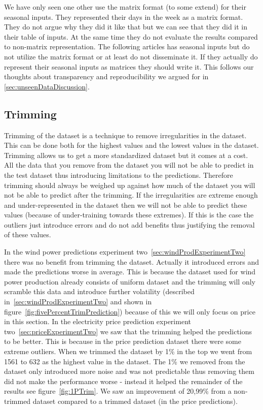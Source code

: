 We have only seen one other \cite{crowley2005weather} use the matrix format (to some extend) for their seasonal inputs. They represented their days in the week as a matrix format. They do not argue why they did it like that but we can see that they did it in their table of inputs. At the same time they do not evaluate the results compared to non-matrix representation. The following articles has seasonal inputs but do not utilize the matrix format \cite{szkuta1999electricity, singhal2011electricity} or at least do not disseminate it. If they actually do represent their seasonal inputs as matrices they should write it. This follows our thoughts about transparency and reproducibility we argued for in \ref{sec:unseenDataDiscussion}.

\subsection{Trimming}
Trimming of the dataset is a technique to remove irregularities in the dataset. This can be done both for the highest values and the lowest values in the dataset. Trimming allows us to get a more standardized dataset but it comes at a cost. All the data that you remove from the dataset you will not be able to predict in the test dataset thus introducing limitations to the predictions. Therefore trimming should always be weighed up against how much of the dataset you will not be able to predict after the trimming. If the irregularities are extreme enough and under-represented in the dataset then we will not be able to predict these values (because of under-training towards these extremes). If this is the case the outliers just introduce errors and do not add benefits thus justifying the removal of these values.

In the wind power predictions experiment two~\ref{sec:windProdExperimentTwo} there was no benefit from trimming the dataset. Actually it introduced errors and made the predictions worse in average. This is because the dataset used for wind power production already consists of uniform dataset and the trimming will only scramble this data and introduce further volatility (described in~\ref{sec:windProdExperimentTwo} and shown in figure~\ref{fig:fivePercentTrimPrediction}) because of this we will only focus on price in this section. In the electricity price prediction experiment two~\ref{sec:priceExperimentTwo} we saw that the trimming helped the predictions to be better. This is because in the price prediction dataset there were some extreme outliers. When we trimmed the dataset by 1\% in the top we went from 1561 to 632 as the highest value in the dataset. The 1\% we removed from the dataset only introduced more noise and was not predictable thus removing them did not make the performance worse - instead it helped the remainder of the results see figure~\ref{fig:1PTrim}. We saw an improvement of 20,99\% from a non-trimmed dataset compared to a trimmed dataset (in the price predictions).

